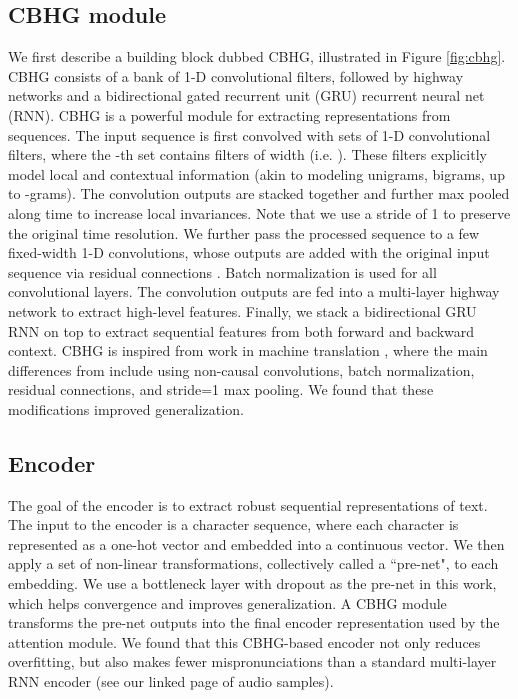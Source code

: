 \documentclass{article} \usepackage{iclr2017_conference,times}
\begin{document}
\subsection{CBHG module}
We first describe a building block dubbed CBHG, illustrated in Figure \ref{fig:cbhg}. CBHG consists of a bank of 1-D convolutional filters, followed by highway networks \citep{srivastava2015highway} and a bidirectional  gated recurrent unit (GRU) \citep{chung2014empirical} recurrent neural net (RNN). CBHG is a powerful module for extracting representations from sequences. The input sequence is first convolved with  sets of 1-D convolutional filters, where the -th set contains  filters of width  (i.e. ). These filters explicitly model local and contextual information (akin to modeling unigrams, bigrams, up to -grams). The convolution outputs are stacked together and further max pooled along time to increase local invariances. Note that we use a stride of 1 to preserve the original time resolution. We further pass the processed sequence to a few fixed-width 1-D convolutions, whose outputs are added with the original input sequence via residual connections \citep{he2016deep}. Batch normalization \citep{ioffe2015batch} is used for all convolutional layers. The convolution outputs are fed into a multi-layer highway network to extract high-level features. Finally, we stack a bidirectional GRU RNN on top to extract sequential features from both forward and backward context. CBHG is inspired from work in machine translation \citep{lee2016fully}, where the main differences from \cite{lee2016fully} include using non-causal convolutions, batch normalization, residual connections, and stride=1 max pooling. We found that these modifications improved generalization. 

\subsection{Encoder}
The goal of the encoder is to extract robust sequential representations of text. The input to the encoder is a character sequence, where each character is represented as a one-hot vector and embedded into a continuous vector. We then apply a set of non-linear transformations, collectively called a ``pre-net", to each embedding. We use a bottleneck layer with dropout as the pre-net in this work, which helps convergence and improves generalization. A CBHG module transforms the pre-net outputs into the final encoder representation used by the attention module.  We found that this CBHG-based encoder not only reduces overfitting, but also makes fewer mispronunciations than a standard multi-layer RNN encoder (see our linked page of audio samples).
\end{document}
